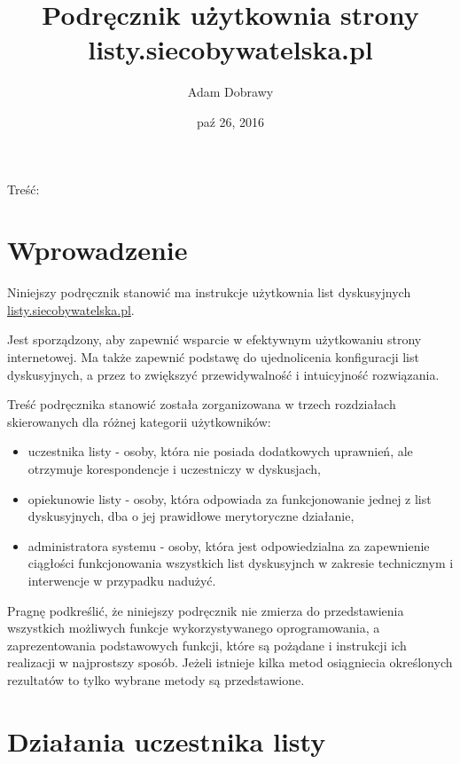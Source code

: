 \documentclass[letterpaper,10pt,polish]{sphinxmanual}
\title{Podręcznik użytkownia strony listy.siecobywatelska.pl}
\date{paź 26, 2016}
\author{Adam Dobrawy}
\begin{document}
\maketitle
\tableofcontents
{}\label{index::doc}


Treść:


\chapter{Wprowadzenie}
\label{introduction::doc}\label{introduction:podrecznik-uzytkownia-strony-listy-siecobywatelska-pl}\label{introduction:wprowadzenie}
Niniejszy podręcznik stanowić ma instrukcje użytkownia list dyskusyjnych \href{https://listy.siecobywatelska.pl}{listy.siecobywatelska.pl}.

Jest sporządzony, aby zapewnić  wsparcie w efektywnym użytkowaniu strony internetowej. Ma także zapewnić podstawę do ujednolicenia konfiguracji list dyskusyjnych, a przez to zwiększyć przewidywalność i intuicyjność rozwiązania.

Treść podręcznika stanowić została zorganizowana w trzech rozdziałach skierowanych dla różnej kategorii użytkowników:
\begin{itemize}
\item {} 
uczestnika listy - osoby, która nie posiada dodatkowych uprawnień, ale otrzymuje korespondencje i uczestniczy w dyskusjach,

\item {} 
opiekunowie listy - osoby, która odpowiada za funkcjonowanie jednej z list dyskusyjnych, dba o jej prawidłowe merytoryczne działanie,

\item {} 
administratora systemu - osoby, która jest odpowiedzialna za zapewnienie ciągłości funkcjonowania wszystkich list dyskusyjnch w zakresie technicznym i interwencje w przypadku nadużyć.

\end{itemize}

Pragnę podkreślić, że niniejszy podręcznik nie zmierza do przedstawienia wszystkich możliwych funkcje wykorzystywanego oprogramowania, a zaprezentowania podstawowych funkcji, które są pożądane i instrukcji ich realizacji w najprostszy sposób. Jeżeli istnieje kilka metod osiągniecia określonych rezultatów to tylko wybrane metody są przedstawione.


\chapter{Działania uczestnika listy}
\label{users:dzialania-uczestnika-listy}\label{users::doc}
\end{document}
